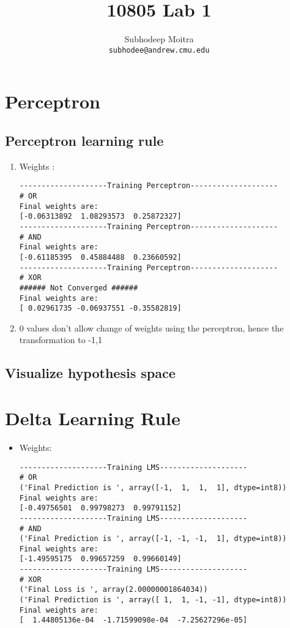 \documentclass{article}
\begin{document}
\title{10805 Lab 1}
\author{Subhodeep Moitra \\ {\tt subhodee@andrew.cmu.edu}}
\date{}

\maketitle

\section{Perceptron}

\subsection{Perceptron learning rule}
\begin{enumerate}

\item Weights : 
\begin{verbatim}
--------------------Training Perceptron--------------------
# OR
Final weights are:
[-0.06313892  1.08293573  0.25872327]
--------------------Training Perceptron--------------------
# AND
Final weights are:
[-0.61185395  0.45884488  0.23660592]
--------------------Training Perceptron--------------------
# XOR
###### Not Converged ######
Final weights are:
[ 0.02961735 -0.06937551 -0.35582819]
\end{verbatim}

\item 0 values don't allow change of weights using the perceptron, hence the transformation to -1,1

\end{enumerate}

\subsection{Visualize hypothesis space}


\section{Delta Learning Rule}

\begin{itemize}


\item Weights:
\begin{verbatim}
--------------------Training LMS--------------------
# OR
('Final Prediction is ', array([-1,  1,  1,  1], dtype=int8))
Final weights are:
[-0.49756501  0.99798273  0.99791152]
--------------------Training LMS--------------------
# AND
('Final Prediction is ', array([-1, -1, -1,  1], dtype=int8))
Final weights are:
[-1.49595175  0.99657259  0.99660149]
--------------------Training LMS--------------------
# XOR
('Final Loss is ', array(2.00000001864034))
('Final Prediction is ', array([ 1,  1, -1, -1], dtype=int8))
Final weights are:
[  1.44805136e-04  -1.71599098e-04  -7.25627296e-05]

\end{verbatim}

\end{itemize}
\end{document}
